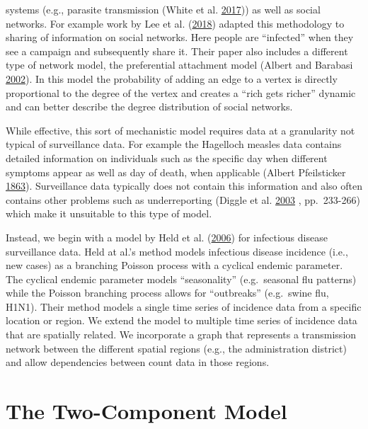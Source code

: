 \documentclass[11pt,a4paper]{article}
\begin{document}
systems (e.g., parasite transmission (White et al.
\protect\hyperlink{ref-white_using_2017}{2017})) as well as social
networks. For example work by Lee et al.
(\protect\hyperlink{ref-lee_network_2018}{2018}) adapted this
methodology to sharing of information on social networks. Here people
are ``infected'' when they see a campaign and subsequently share it.
Their paper also includes a different type of network model, the
preferential attachment model (Albert and Barabasi
\protect\hyperlink{ref-albert_statistical_2002}{2002}). In this model
the probability of adding an edge to a vertex is directly proportional
to the degree of the vertex and creates a ``rich gets richer'' dynamic
and can better describe the degree distribution of social networks.

While effective, this sort of mechanistic model requires data at a
granularity not typical of surveillance data. For example the Hagelloch
measles data contains detailed information on individuals such as the
specific day when different symptoms appear as well as day of death,
when applicable (Albert Pfeilsticker
\protect\hyperlink{ref-albert_pfeilsticker_beitrage_1863}{1863}).
Surveillance data typically does not contain this information and also
often contains other problems such as underreporting (Diggle et al.
\protect\hyperlink{ref-diggle_-line_2003}{2003} , pp.~233-266) which
make it unsuitable to this type of model.

Instead, we begin with a model by Held et al.
(\protect\hyperlink{ref-held_two-component_2006}{2006}) for infectious
disease surveillance data. Held at al.'s method models infectious
disease incidence (i.e., new cases) as a branching Poisson process with
a cyclical endemic parameter. The cyclical endemic parameter models
``seasonality'' (e.g.~seasonal flu patterns) while the Poisson branching
process allows for ``outbreaks'' (e.g.~swine flu, H1N1). Their method
models a single time series of incidence data from a specific location
or region. We extend the model to multiple time series of incidence data
that are spatially related. We incorporate a graph that represents a
transmission network between the different spatial regions (e.g., the
administration district) and allow dependencies between count data in
those regions.

\hypertarget{the-two-component-model}{%
\section{The Two-Component Model}\label{the-two-component-model}}
\end{document}
